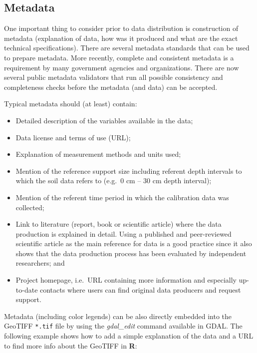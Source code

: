 \documentclass[10pt,b5paper,]{book}
\providecommand{\tightlist}{%
  \setlength{\itemsep}{0pt}\setlength{\parskip}{0pt}}
\theoremstyle{definition}
\theoremstyle{definition}
\theoremstyle{definition}
\theoremstyle{remark}
\begin{document}
\hypertarget{metadata}{%
\subsection{Metadata}\label{metadata}}

One important thing to consider prior to data distribution is
construction of metadata (explanation of data, how was it produced and
what are the exact technical specifications). There are several metadata
standards that can be used to prepare metadata. More recently, complete
and consistent metadata is a requirement by many government agencies and
organizations. There are now several public metadata validators that run
all possible consistency and completeness checks before the metadata
(and data) can be accepted.

Typical metadata should (at least) contain:

\begin{itemize}
\tightlist
\item
  Detailed description of the variables available in the data;
\item
  Data license and terms of use (URL);
\item
  Explanation of measurement methods and units used;
\item
  Mention of the reference support size including referent depth
  intervals to which the soil data refers to (e.g.~0 cm -- 30 cm depth
  interval);
\item
  Mention of the referent time period in which the calibration data was
  collected;
\item
  Link to literature (report, book or scientific article) where the data
  production is explained in detail. Using a published and peer-reviewed
  scientific article as the main reference for data is a good practice
  since it also shows that the data production process has been
  evaluated by independent researchers; and
\item
  Project homepage, i.e.~URL containing more information and especially
  up-to-date contacts where users can find original data producers and
  request support.
\end{itemize}

Metadata (including color legends) can be also directly embedded into
the GeoTIFF \texttt{*.tif} file by using the \emph{gdal\_edit} command
available in GDAL. The following example shows how to add a simple
explanation of the data and a URL to find more info about the GeoTIFF in
\textbf{R}:
\end{document}
